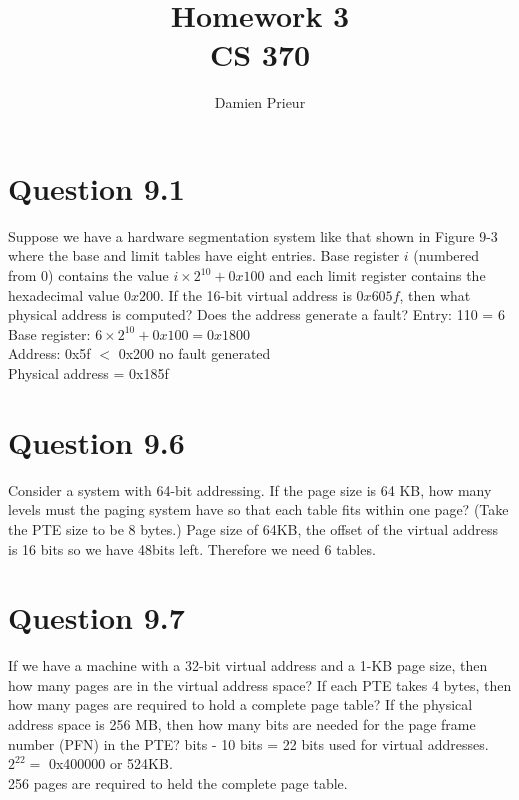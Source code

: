 \documentclass{article}
\author{Damien Prieur}
\title{Homework 3 \\ CS 370}
\date{}
\begin{document}
\maketitle

\section*{Question 9.1}
Suppose we have a hardware segmentation system like that shown in Figure 9-3 where the base and limit tables have eight entries.
Base register $i$ (numbered from 0) contains the value $i\times 2^{10} + 0x100$ and each limit register contains the hexadecimal value $0x200$.
If the 16-bit virtual address is $0x605f$, then what physical address is computed?
Does the address generate a fault?
\newline
\newline
Entry: 110 = 6 \\
Base register: $6\times 2^{10}+0x100 = 0x1800$ \\
Address: 0x5f $<$ 0x200 no fault generated \\
Physical address = 0x185f


\section*{Question 9.6}
Consider a system with 64-bit addressing. If the page size is 64 KB, how many levels must the paging system have so that each table fits within one page? (Take the PTE size to be 8 bytes.)
\newline
\newline
Page size of 64KB, the offset of the virtual address is 16 bits so we have 48bits left. Therefore we need 6 tables.

\section*{Question 9.7}
If we have a machine with a 32-bit virtual address and a 1-KB page size, then how many pages are in the virtual address space?
If each PTE takes 4 bytes, then how many pages are required to hold a complete page table?
If the physical address space is 256 MB, then how many bits are needed for the page frame number (PFN) in the PTE?
\newline
{} bits - 10 bits = 22 bits used for virtual addresses. $2^{22} = $ 0x400000 or 524KB. \\
256 pages are required to held the complete page table.
\end{document}
